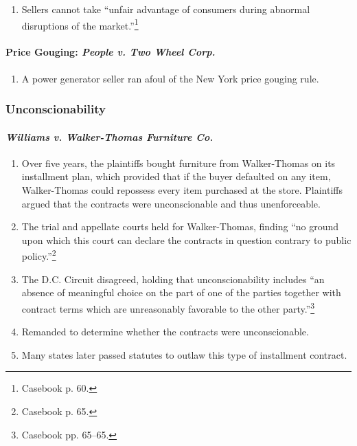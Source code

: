 \begin{enumerate}
    \item Sellers cannot take ``unfair advantage of consumers during abnormal 
    disruptions of the market.''\footnote{Casebook p. 60.}
\end{enumerate}

\paragraph{Price Gouging: \emph{People v. Two Wheel Corp.}}

\begin{enumerate}
    \item A power generator seller ran afoul of the New York price gouging 
    rule.
\end{enumerate}

\subsubsection{Unconscionability}

\paragraph{\emph{Williams v. Walker-Thomas Furniture Co.}}

\begin{enumerate}
    \item Over five years, the plaintiffs bought furniture from Walker-Thomas 
    on its installment plan, which provided that if the buyer defaulted on any 
    item, Walker-Thomas could repossess every item purchased at the store. 
    Plaintiffs argued that the contracts were unconscionable and thus 
    unenforceable.
    \item The trial and appellate courts held for Walker-Thomas, finding ``no 
    ground upon which this court can declare the contracts in question 
    contrary to public policy.''\footnote{Casebook p. 65.}
    \item The D.C. Circuit disagreed, holding that unconscionability includes 
    ``an absence of meaningful choice on the part of one of the parties 
    together with contract terms which are unreasonably favorable to the other 
    party.''\footnote{Casebook pp. 65--65.}
    \item Remanded to determine whether the contracts were unconscionable.
    \item Many states later passed statutes to outlaw this type of installment 
    contract.
\end{enumerate}
 
